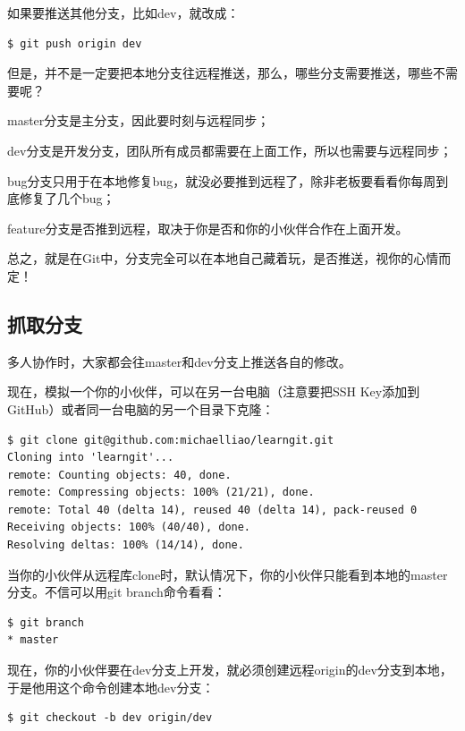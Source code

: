 如果要推送其他分支，比如dev，就改成：

\begin{verbatim}
$ git push origin dev
\end{verbatim}

但是，并不是一定要把本地分支往远程推送，那么，哪些分支需要推送，哪些不需要呢？

master分支是主分支，因此要时刻与远程同步；

dev分支是开发分支，团队所有成员都需要在上面工作，所以也需要与远程同步；

bug分支只用于在本地修复bug，就没必要推到远程了，除非老板要看看你每周到底修复了几个bug；

feature分支是否推到远程，取决于你是否和你的小伙伴合作在上面开发。

总之，就是在Git中，分支完全可以在本地自己藏着玩，是否推送，视你的心情而定！

\subsection{抓取分支}

多人协作时，大家都会往master和dev分支上推送各自的修改。

现在，模拟一个你的小伙伴，可以在另一台电脑（注意要把SSH Key添加到GitHub）或者同一台电脑的另一个目录下克隆：

\begin{verbatim}
$ git clone git@github.com:michaelliao/learngit.git
Cloning into 'learngit'...
remote: Counting objects: 40, done.
remote: Compressing objects: 100% (21/21), done.
remote: Total 40 (delta 14), reused 40 (delta 14), pack-reused 0
Receiving objects: 100% (40/40), done.
Resolving deltas: 100% (14/14), done.
\end{verbatim}

当你的小伙伴从远程库clone时，默认情况下，你的小伙伴只能看到本地的master分支。不信可以用git branch命令看看：

\begin{verbatim}
$ git branch
* master
\end{verbatim}

现在，你的小伙伴要在dev分支上开发，就必须创建远程origin的dev分支到本地，于是他用这个命令创建本地dev分支：

\begin{verbatim}
$ git checkout -b dev origin/dev
\end{verbatim}

